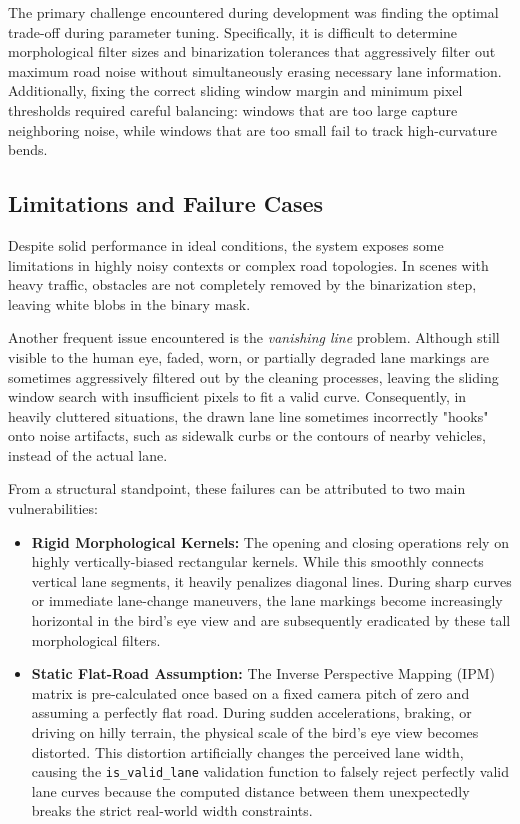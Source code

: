 \documentclass[12pt,a4paper]{article}
\begin{document}
The primary challenge encountered during development was finding the optimal trade-off during parameter tuning. Specifically, it is difficult to determine morphological filter sizes and binarization tolerances that aggressively filter out maximum road noise without simultaneously erasing necessary lane information. Additionally, fixing the correct sliding window margin and minimum pixel thresholds required careful balancing: windows that are too large capture neighboring noise, while windows that are too small fail to track high-curvature bends.

\subsection{Limitations and Failure Cases}
Despite solid performance in ideal conditions, the system exposes some limitations in highly noisy contexts or complex road topologies. In scenes with heavy traffic, obstacles are not completely removed by the binarization step, leaving white blobs in the binary mask. 

Another frequent issue encountered is the \textit{vanishing line} problem. Although still visible to the human eye, faded, worn, or partially degraded lane markings are sometimes aggressively filtered out by the cleaning processes, leaving the sliding window search with insufficient pixels to fit a valid curve. Consequently, in heavily cluttered situations, the drawn lane line sometimes incorrectly "hooks" onto noise artifacts, such as sidewalk curbs or the contours of nearby vehicles, instead of the actual lane.

From a structural standpoint, these failures can be attributed to two main vulnerabilities:
\begin{itemize}
    \item \textbf{Rigid Morphological Kernels:} The opening and closing operations rely on highly vertically-biased rectangular kernels. While this smoothly connects vertical lane segments, it heavily penalizes diagonal lines. During sharp curves or immediate lane-change maneuvers, the lane markings become increasingly horizontal in the bird's eye view and are subsequently eradicated by these tall morphological filters.
    \item \textbf{Static Flat-Road Assumption:} The Inverse Perspective Mapping (IPM) matrix is pre-calculated once based on a fixed camera pitch of zero and assuming a perfectly flat road. During sudden accelerations, braking, or driving on hilly terrain, the physical scale of the bird's eye view becomes distorted. This distortion artificially changes the perceived lane width, causing the \texttt{is\_valid\_lane} validation function to falsely reject perfectly valid lane curves because the computed distance between them unexpectedly breaks the strict real-world width constraints.
\end{itemize}
\end{document}
